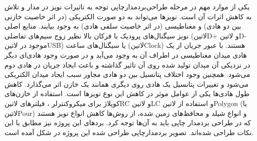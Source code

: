 یکی از موارد مهم در مرحله طراحی‌بردمدارچاپی توجه به تاثیرات نویز در مدار و تلاش به کاهش اثرات آن است. نویز‌ها می‌تواند به دو صورت الکتریکی (در اثر خاصیت خازنی بین دو هادی) و مغناطیسی (در اثر خاصیت سلفی هادی) به وجود بیایند. منابع اصلی نویز سیگنال‌های پرودیک با فرکان بالا نظیر زوج سیم‌های تفاضلی (‌لاتین{D+} و ‌لاتین{D-} موجود در ‌لاتین{USB}) یا سیگنال‌های ساعت (‌لاتین{Clock}) هستند. با عبور جریان از یک هادی میدان مغناطیسی در اطراف آن به وجود می‌آید و در صورت وجود هادی‌ای دیگر در نزدیکی آن میدان تولید شده روی آن تاثیر گذاشته و باعث ایجاد جریان در هادی دوم می‌شود. همچنین وجود اختلاف پتانسیل بین دو هادی مجاور سبب ایجاد میدان الکتریکی می‌شود و تغییرات پتانسیل یک هادی روی دیگری همانند یک خازن اثر می‌گذارد. کاهش طول هادی‌ها یکی از عوامل موثر در کاهش این نوع نویز‌ها است. استفاده از خازن‌های کوپلاژ برای میکروکنترلر ، فیلتر‌های ‌لاتین{RC} و ‌لاتین{LC} و استفاده از ‌لاتین{Polygon} (یا ‌لاتین{Pour}) و انواع شیلد و محافظ‌های زمین شده، از روش‌ها کاهش انواع نویز هستند که در طراحی بردمدار چاپی باید به آن‌ها توجه کرد. برد‌های این پروژه نیز مطابق با این نکات طراحی شده‌اند. تصویر برد‌مدار‌‌چاپی طراحی شده این پروژه در شکل  آمده است.

